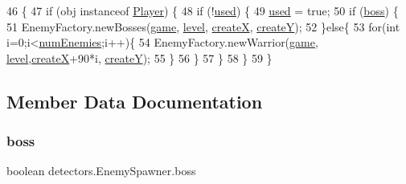 \begin{DoxyCode}
46                                        \{
47         \textcolor{keywordflow}{if} (obj instanceof \mbox{\hyperlink{class_player}{Player}}) \{
48             \textcolor{keywordflow}{if} (!\mbox{\hyperlink{classdetectors_1_1_enemy_spawner_aad3d7a72c57ee7c071900199b74ca0bf}{used}}) \{
49                 \mbox{\hyperlink{classdetectors_1_1_enemy_spawner_aad3d7a72c57ee7c071900199b74ca0bf}{used}} = \textcolor{keyword}{true};
50                 \textcolor{keywordflow}{if} (\mbox{\hyperlink{classdetectors_1_1_enemy_spawner_a1d4038a75d86f476b072ebb3d4a0a345}{boss}}) \{
51                     EnemyFactory.newBosses(\mbox{\hyperlink{classdetectors_1_1_enemy_spawner_af4c20a8a788ed80f1379da33fa15d4a2}{game}}, \mbox{\hyperlink{classdetectors_1_1_enemy_spawner_a7a6789978d67aac73834d97f875ad213}{level}}, \mbox{\hyperlink{classdetectors_1_1_enemy_spawner_ab14511f92f58a32c0b062c97add58a51}{createX}}, 
      \mbox{\hyperlink{classdetectors_1_1_enemy_spawner_ac460462da79f38d12eb840cc4d844759}{createY}});
52                 \}\textcolor{keywordflow}{else}\{
53                     \textcolor{keywordflow}{for}(\textcolor{keywordtype}{int} i=0;i<\mbox{\hyperlink{classdetectors_1_1_enemy_spawner_a869e98916cf4024aa0365094b7228aab}{numEnemies}};i++)\{
54                         EnemyFactory.newWarrior(\mbox{\hyperlink{classdetectors_1_1_enemy_spawner_af4c20a8a788ed80f1379da33fa15d4a2}{game}}, \mbox{\hyperlink{classdetectors_1_1_enemy_spawner_a7a6789978d67aac73834d97f875ad213}{level}},\mbox{\hyperlink{classdetectors_1_1_enemy_spawner_ab14511f92f58a32c0b062c97add58a51}{createX}}+90*i,
      \mbox{\hyperlink{classdetectors_1_1_enemy_spawner_ac460462da79f38d12eb840cc4d844759}{createY}});
55                     \}
56                 \}
57             \}
58         \}
59     \}
\end{DoxyCode}


\subsection{Member Data Documentation}
\mbox{\label{classdetectors_1_1_enemy_spawner_a1d4038a75d86f476b072ebb3d4a0a345}} 
\subsubsection{\texorpdfstring{boss}{boss}}
{\footnotesize\ttfamily boolean detectors.\+Enemy\+Spawner.\+boss\hspace{0.3cm}{\ttfamily [private]}}

